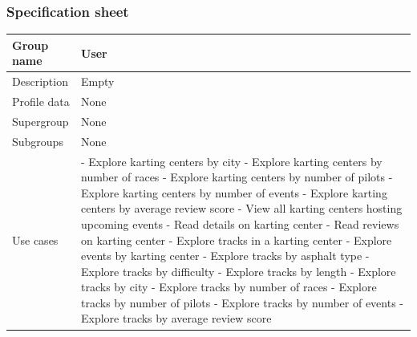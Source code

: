 \documentclass{beamer}
\begin{document}
\begin{frame}
    \frametitle{Specification sheet}
    \begin{table}
        \tiny
        \begin{tabular}{|p{2cm}|p{6cm}|}
        \hline
        Group name & \textbf{User} \\
        \hline
        Description & Empty \\
        \hline
        Profile data & None \\
        Supergroup & None \\
        \hline
        Subgroups & None \\
        \hline
        Use cases &
        - Explore karting centers by city \newline
        - Explore karting centers by number of races \newline
        - Explore karting centers by number of pilots \newline
        - Explore karting centers by number of events \newline
        - Explore karting centers by average review score \newline
        - View all karting centers hosting upcoming events \newline
        - Read details on karting center \newline
        - Read reviews on karting center \newline
        - Explore tracks in a karting center \newline
        - Explore events by karting center \newline
        - Explore tracks by asphalt type \newline
        - Explore tracks by difficulty \newline
        - Explore tracks by length \newline
        - Explore tracks by city \newline
        - Explore tracks by number of races \newline
        - Explore tracks by number of pilots \newline
        - Explore tracks by number of events \newline
        - Explore tracks by average review score \\
        \hline
        \end{tabular}
    \end{table}
\end{frame}
\end{document}
